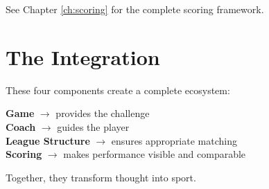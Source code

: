 See Chapter \ref{ch:scoring} for the complete scoring framework.

\section{The Integration}

These four components create a complete ecosystem:

\begin{center}
\textbf{Game} $\rightarrow$ provides the challenge\\
\textbf{Coach} $\rightarrow$ guides the player\\
\textbf{League Structure} $\rightarrow$ ensures appropriate matching\\
\textbf{Scoring} $\rightarrow$ makes performance visible and comparable
\end{center}

Together, they transform thought into sport.

